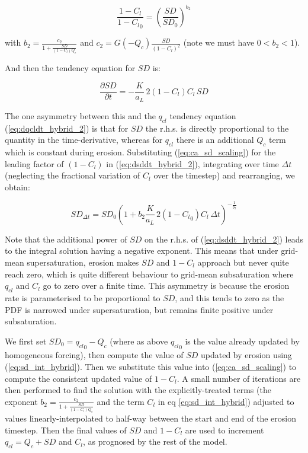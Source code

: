 \documentclass{UMDP_article}
\begin{document}
\begin{enumerate}
\begin{enumerate}
\begin{equation}
\frac{1-C_l}{1-{C_l}_0} = \left( \frac{SD}{SD_0} \right)^{b_2}
\label{eq:ca_sd_scaling}
\end{equation}

with $b_2 = \frac{ c_2 }{ 1 + \frac{SD}{(1-C_l) Q_c} }$
and $c_2 = G(-Q_c) \frac{SD}{(1-C_l)^2}$
(note we must have $0 < b_2 < 1$).

And then the tendency equation for $SD$ is:

\begin{equation}
\frac{\partial SD}{\partial t} = -\frac{K}{a_L} \, 2 (1 - C_l) C_l \, SD
\label{eq:dsddt_hybrid_2}
\end{equation}

The one asymmetry between this and the $q_{cl}$ tendency equation
(\ref{eq:dqcldt_hybrid_2}) is that for $SD$ the r.h.s. is directly proportional
to the quantity in the time-derivative, whereas for $q_{cl}$ there is an
additional $Q_c$ term which is constant during erosion.
Substituting (\ref{eq:ca_sd_scaling}) for the leading factor of
$(1 - C_l)$ in (\ref{eq:dsddt_hybrid_2}), integrating over time $\Delta t$
(neglecting the fractional variation of $C_l$ over the timestep)
and rearranging, we obtain:

\begin{equation}
{SD}_{\Delta t} = {SD}_0 \left( 1 + b_2
    \frac{K}{a_L} \, 2 (1-{C_l}_0) C_l \, \Delta t
                      \right)^{-\frac{1}{b_2}}
\label{eq:sd_int_hybrid}
\end{equation}

Note that the additional power of $SD$ on the r.h.s. of
(\ref{eq:dsddt_hybrid_2}) leads to the integral solution having
a negative exponent.  This means that under grid-mean supersaturation,
erosion makes $SD$ and $1-C_l$ approach but never quite reach zero,
which is quite different behaviour to grid-mean subsaturation where
$q_{cl}$ and $C_l$ go to zero over a finite time.
This asymmetry is because the erosion rate is parameterised to be
proportional to $SD$, and this tends to zero as the PDF is narrowed
under supersaturation, but remains finite positive under subsaturation.

We first set ${SD}_0 = {q_{cl}}_0 - Q_c$ (where as above ${q_{cl}}_0$ is
the value already updated by homogeneous forcing),
then compute the value of $SD$ updated by erosion using
(\ref{eq:sd_int_hybrid}).
Then we substitute this value into (\ref{eq:ca_sd_scaling}) to compute
the consistent updated value of $1-C_l$.
A small number of iterations are then performed
to find the solution with the explicitly-treated terms
(the exponent $b_2 = \frac{ c_2 }{ 1 + \frac{SD}{(1-C_l) Q_c} }$
and the term $C_l$ in eq \ref{eq:sd_int_hybrid})
adjusted to values linearly-interpolated to half-way between the
start and end of the erosion timestep.
Then the final values of $SD$ and $1-C_l$ are used to increment
$q_{cl} = Q_c + SD$ and $C_l$, as prognosed by the rest of the model.


\end{enumerate}
\end{enumerate}
\end{document}
